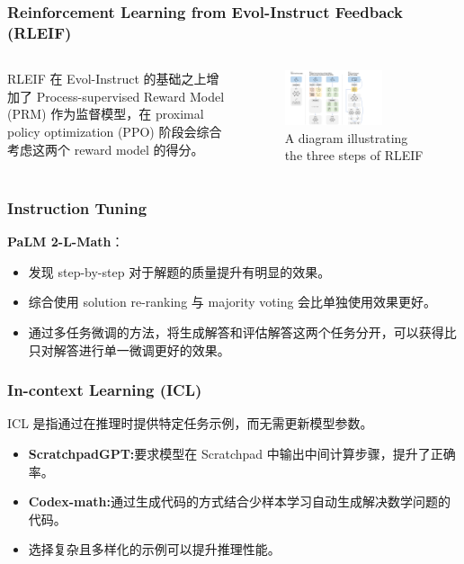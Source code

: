 \begin{frame}
	\frametitle{Reinforcement Learning from Evol-Instruct
		Feedback (RLEIF)}
		\begin{columns}
			\begin{column}{.2\textwidth}
				{\small RLEIF 在 Evol-Instruct 的基础之上增加了  Process-supervised Reward Model (PRM) 作为监督模型，在 proximal policy optimization (PPO) 阶段会综合考虑这两个 reward model 的得分。}
			\end{column}
			\begin{column}{.8\textwidth}
	\begin{figure}
		\centering
		\includegraphics[width=0.7\textwidth, scale=1, trim=39 0 175 0,clip]{pic/reinforcement_evol_instruct.pdf}
		\caption{A diagram illustrating the three steps of RLEIF}
		\label{fig:reinforcement_evol_instruct_pic}
	\end{figure}
\end{column}
\end{columns}
\end{frame}

\begin{frame}
	\frametitle{Instruction Tuning}
	\textbf{PaLM 2-L-Math}：
	\begin{itemize}
		\item 发现 step-by-step 对于解题的质量提升有明显的效果。
		\item 综合使用 solution re-ranking 与 majority voting 会比单独使用效果更好。
		\item 通过多任务微调的方法，将生成解答和评估解答这两个任务分开，可以获得比只对解答进行单一微调更好的效果。
	\end{itemize}
\end{frame}

\begin{frame}
	\frametitle{In-context Learning (ICL)}
	ICL 是指通过在推理时提供特定任务示例，而无需更新模型参数。
	\begin{itemize}
		\item \textbf{ScratchpadGPT:}要求模型在 Scratchpad 中输出中间计算步骤，提升了正确率。
		\pause 
		\item \textbf{Codex-math:}通过生成代码的方式结合少样本学习自动生成解决数学问题的代码。
		\pause
		\item 选择复杂且多样化的示例可以提升推理性能。
	\end{itemize}
\end{frame}